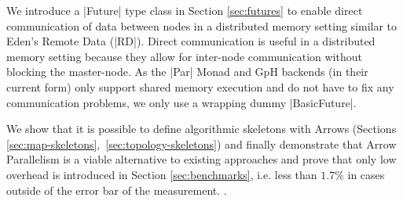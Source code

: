We introduce a |Future| type class in Section \ref{sec:futures} to enable direct communication of data between nodes in a distributed memory setting similar to Eden's Remote Data (|RD|). Direct communication is useful in a distributed memory setting because they allow for inter-node communication without blocking the master-node. As the |Par| Monad and GpH backends (in their current form) only support shared memory execution and do not have to fix any communication problems, we only use a wrapping dummy |BasicFuture|.

We show that it is possible to define algorithmic skeletons with Arrows (Sections \ref{sec:map-skeletons},~\ref{sec:topology-skeletons}) and finally demonstrate that Arrow Parallelism is a viable alternative to existing approaches and prove that only low overhead is introduced in Section \ref{sec:benchmarks}, i.e. less than $1.7\%$ in cases outside of the error bar of the measurement. .







